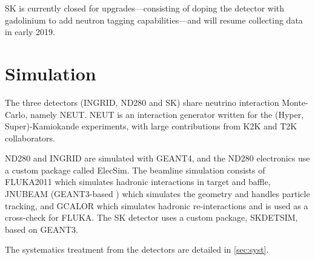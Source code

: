 SK is currently closed for upgrades---consisting of doping the detector with gadolinium to add neutron tagging capabilities---and will resume collecting data in early 2019\cite{superk_upgrade}.

\section{Simulation}
The three detectors (INGRID, ND280 and SK) share neutrino interaction Monte-Carlo, namely NEUT\cite{neut}. NEUT is an interaction generator written for the (Hyper, Super)-Kamiokande experiments, with large contributions from K2K and T2K collaborators.

ND280 and INGRID are simulated with GEANT4\cite{t2k_det,geant4}, and the ND280 electronics use a custom package called ElecSim. The beamline simulation consists of FLUKA2011 \cite{fluka2008_1, fluka2008_2, fluka2011} which simulates hadronic interactions in target and baffle, JNUBEAM (GEANT3-based \cite{geant3}) which simulates the geometry and handles particle tracking, and GCALOR \cite{gcalor} which simulates hadronic re-interactions and is used as a cross-check for FLUKA\cite{t2k_beam, t2k_tn_flux}. The SK detector uses a custom package, SKDETSIM\cite{t2k_sk}, based on GEANT3\cite{geant3}.

The systematics treatment from the detectors are detailed in \autoref{sec:syst}.
